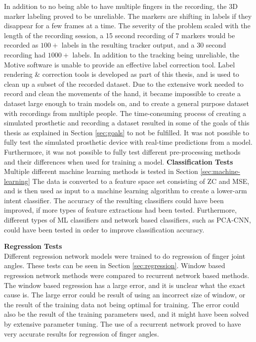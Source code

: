 \documentclass[../main.tex]{subfiles}
\begin{document}
In addition to no being able to have multiple fingers in the recording, the 3D marker labeling proved to be unreliable.
The markers are shifting in labels if they disappear for a few frames at a time.
The severity of the problem scaled with the length of the recording session, a 15 second recording of 7 markers would be recorded as $100+$ labels in the resulting tracker output, and a 30 second recording had $1000+$ labels.
In addition to the tracking being unreliable, the Motive software is unable to provide an effective label correction tool.
Label rendering \& correction tools is developed as part of this thesis, and is used to clean up a subset of the recorded dataset.
Due to the extensive work needed to record and clean the movements of the hand, it became impossible to create a dataset large enough to train models on, and to create a general purpose dataset with recordings from multiple people. 
The time-consuming process of creating a simulated prosthetic and recording a dataset resulted in some of the goals of this thesis as explained in Section \ref{sec:goals} to not be fulfilled.
It was not possible to fully test the simulated prosthetic device with real-time predictions from a model. 
Furthermore, it was not possible to fully test different pre-processing methods and their differences when used for training a model.
\newpage
\textbf{Classification Tests}\\
Multiple different machine learning methods is tested in Section  \ref{sec:machine-learning}
The data is converted to a feature space set consisting of \gls{ZC} and \gls{MSE}, and is then used as input to a machine learning algorithm to create a lower-arm intent classifier.
The accuracy of the resulting classifiers could have been improved, if more types of feature extractions had been tested.
Furthermore, different types of \gls{ML} classifiers and network based classifiers, such as \gls{PCA}-\gls{CNN}, could have been tested in order to improve classification accuracy.

\textbf{Regression Tests}\\
Different regression network models were trained to do regression of finger joint angles. These tests can be seen in Section \ref{sec:regression}.
Window based regression network methods were compared to recurrent network based methods.
The window based regression has a large error, and it is unclear what the exact cause is.
The large error could be result of using an incorrect size of window, or the result of the training data not being optimal for training.
The error could also be the result of the training parameters used, and it might have been solved by extensive parameter tuning.
The use of a recurrent network proved to have very accurate results for regression of finger angles.
\end{document}
